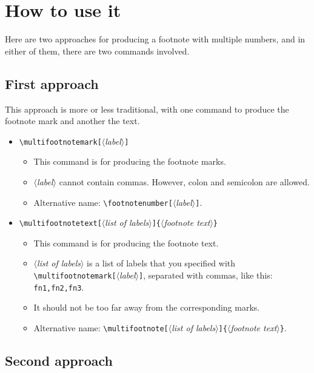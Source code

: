 \documentclass[classical]{einfart}
\newcommand{\meta}[1]{$\langle${\normalfont\itshape#1}$\rangle$}
\newcommand{\commandoption}[1]{\texttt{\textcolor{code-keys}{#1}}}
\begin{document}
\section{How to use it}

Here are two approaches for producing a footnote with multiple numbers, and in either of them, there are two commands involved.

\subsection{First approach}

This approach is more or less traditional, with one command to produce the footnote mark and another the text.
\begin{itemize}
    \item \lstinline|\multifootnotemark[|\meta{label}\lstinline|]|
    \begin{itemize}
        \item This command is for producing the footnote marks.
        \item \meta{label} cannot contain commas. However, colon \textquote{\texttt{:}} and semicolon \textquote{\texttt{;}} are allowed.
        \item Alternative name: \lstinline|\footnotenumber[|\meta{label}\lstinline|]|.
    \end{itemize}
    \item \lstinline|\multifootnotetext[|\meta{list of labels}\lstinline|]{|\meta{footnote text}\lstinline|}|
    \begin{itemize}
        \item This command is for producing the footnote text.
        \item \meta{list of labels} is a list of labels that you specified with \lstinline|\multifootnotemark[|\meta{label}\lstinline|]|, separated with commas, like this: \commandoption{fn1,fn2,fn3}.
        \item It should not be too far away from the corresponding marks.
        \item Alternative name: \lstinline|\multifootnote[|\meta{list of labels}\lstinline|]{|\meta{footnote text}\lstinline|}|.
    \end{itemize}
\end{itemize}

\subsection{Second approach}
\end{document}
